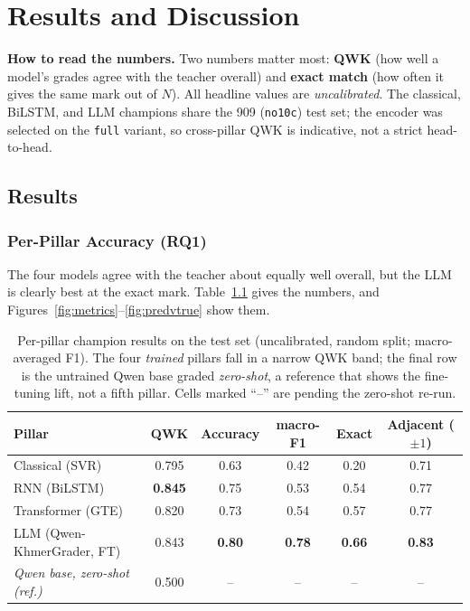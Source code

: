 \chapter{Results and Discussion}
\label{ch:results}

\textbf{How to read the numbers.} Two numbers matter most: \textbf{QWK} (how well a model's grades
agree with the teacher overall) and \textbf{exact match} (how often it gives the same mark out of $N$).
All headline values are \emph{uncalibrated}. The classical, BiLSTM, and LLM champions share the 909
(\texttt{no10c}) test set; the encoder was selected on the \texttt{full} variant, so cross-pillar QWK
is indicative, not a strict head-to-head.

\section{Results}
\label{sec:results}

\subsection{Per-Pillar Accuracy (RQ1)}
\label{sec:results-pillars}
The four models agree with the teacher about equally well overall, but the LLM is clearly best at the
exact mark. Table~\ref{tab:champs} gives the numbers, and Figures~\ref{fig:metrics}--\ref{fig:predvtrue}
show them.

\begin{table}[t]
\centering
\caption[Per-pillar champion results on the test set]{Per-pillar champion results on the test set
(uncalibrated, random split; macro-averaged F1). The four \emph{trained} pillars fall in a narrow QWK
band; the final row is the untrained Qwen base graded \emph{zero-shot}, a reference that shows the
fine-tuning lift, not a fifth pillar. Cells marked ``--'' are pending the zero-shot re-run.}
\label{tab:champs}
\small
\begin{tabular}{@{}lccccc@{}}
\toprule
Pillar & QWK & Accuracy & macro-F1 & Exact & Adjacent ($\pm1$) \\
\midrule
Classical (SVR)            & 0.795 & 0.63 & 0.42 & 0.20 & 0.71 \\
RNN (BiLSTM)               & \textbf{0.845} & 0.75 & 0.53 & 0.54 & 0.77 \\
Transformer (GTE)          & 0.820 & 0.73 & 0.54 & 0.57 & 0.77 \\
LLM (Qwen-KhmerGrader, FT) & 0.843 & \textbf{0.80} & \textbf{0.78} & \textbf{0.66} & \textbf{0.83} \\
\midrule
\emph{Qwen base, zero-shot (ref.)} & 0.500 & -- & -- & -- & -- \\
\bottomrule
\end{tabular}
\end{table}

